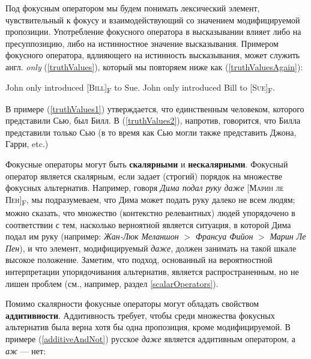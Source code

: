 \documentclass[a4paper, titlepage]{article}
\begin{document}
\medskip

Под фокусным оператором мы будем понимать лексический элемент, чувствительный к фокусу и взаимодействующий со значением модифицируемой пропозиции. Употребление фокусного оператора в высказывании влияет либо на пресуппозицию, либо на истинностное значение высказывания. Примером фокусного оператора, вдлияющего на истинность высказывания, может служить англ. \textit{only} (\ref{truthValues}), который мы повторяем ниже как (\ref{truthValuesAgain}):

\begin{exe}
    \ex \begin{xlist} \label{truthValuesAgain}
        \ex \label{truthValues1} John only introduced [\textsc{Bill}]\textsubscript{F} to Sue.
        \ex \label{truthValues2} John only introduced Bill to [\textsc{Sue}]\textsubscript{F}.
    \end{xlist}
\end{exe}

В примере (\ref{truthValues1}) утверждается, что единственным человеком, которого представили Сью, был Билл. В (\ref{truthValues2}), напротив, говорится, что Билла представили только Сью (в то время как Сью могли также представить Джона, Гарри, etc.) 

\medskip

Фокусные операторы могут быть \textbf{скалярными} и \textbf{нескалярными}. Фокусный оператор является скалярным, если задает (строгий) порядок на множестве фокусных альтернатив. Например, говоря \textit{Дима подал руку даже} [\textsc{Марин ле Пен}]\textsubscript{F}, мы подразумеваем, что Дима может подать руку далеко не всем людям; можно сказать, что множество (контекстно релевантных) людей упорядочено в соответствии с тем, насколько верноятной является ситуация, в которой Дима подал им руку (например: \textit{Жан-Люк Меланшон} $ > $ \textit{Франсуа Фийон} $ > $ \textit{Марин Ле Пен}), и что элемент, модифицируемый \textit{даже}, должен занимать на такой шкале высокое положение.  Заметим, что подход, основанный на вероятностной интерпретации упорядочивания альтернатив, является распространенным, но не лишен проблем (см., например, раздел \ref{scalarOperators}).

\medskip

Помимо скалярности фокусные операторы могут обладать свойством \textbf{аддитивности}. Аддитивность требует, чтобы среди множества фокусных альтернатив была верна хотя бы одна пропозиция, кроме модифицируемой. В примере (\ref{additiveAndNot}) русское \textit{даже} является аддитивным оператором, а \textit{аж} --- нет:
\end{document}
